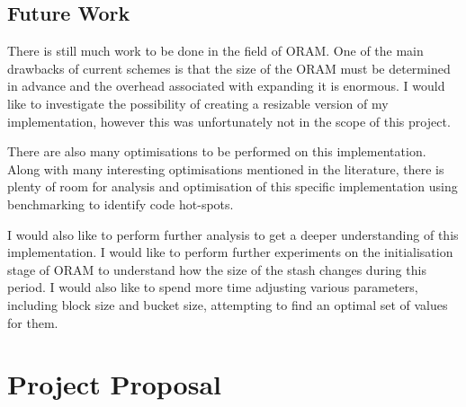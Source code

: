 \documentclass[12pt,a4paper,twoside,openright]{report}
\begin{document}
\section{Future Work}

There is still much work to be done in the field of ORAM. One of the main drawbacks of current schemes is that the size of the ORAM must be determined in advance and the overhead associated with expanding it is enormous. I would like to investigate the possibility of creating a resizable version of my implementation, however this was unfortunately not in the scope of this project.

There are also many optimisations to be performed on this implementation. Along with many interesting optimisations mentioned in the literature, there is plenty of room for analysis and optimisation of this specific implementation using benchmarking to identify code hot-spots.

I would also like to perform further analysis to get a deeper understanding of this implementation. I would like to perform further experiments on the initialisation stage of ORAM to understand how the size of the stash changes during this period. I would also like to spend more time adjusting various parameters, including block size and bucket size, attempting to find an optimal set of values for them.



\appendix

\chapter{Project Proposal}


\end{document}
